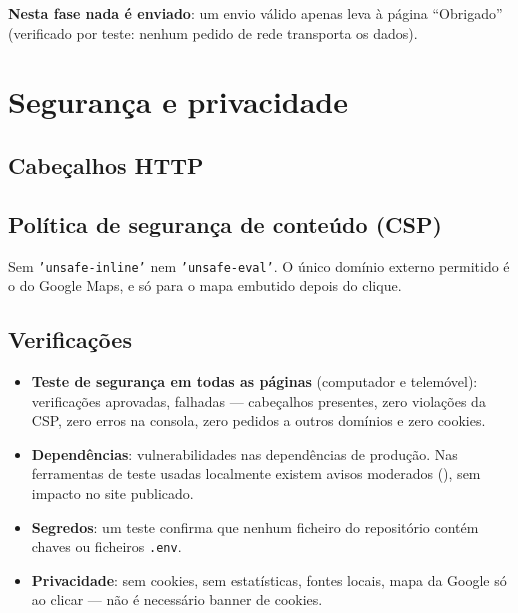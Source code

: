 \documentclass[11pt,a4paper]{article}
\begin{document}
\textbf{Nesta fase nada é enviado}: um envio válido apenas leva à página ``Obrigado'' (verificado por teste:
nenhum pedido de rede transporta os dados).

\section{Segurança e privacidade}
\subsection{Cabeçalhos HTTP}
\resHeadersTable

\subsection{Política de segurança de conteúdo (CSP)}
\resCspList
Sem \texttt{'unsafe-inline'} nem \texttt{'unsafe-eval'}. O único domínio externo permitido é o do Google
Maps, e só para o mapa embutido depois do clique.

\subsection{Verificações}
\begin{itemize}
  \item \textbf{Teste de segurança em todas as páginas} (computador e telemóvel): \resSecPassed{} verificações aprovadas, \resSecFailed{} falhadas --- cabeçalhos presentes, zero violações da CSP, zero erros na consola, zero pedidos a outros domínios e zero cookies.
  \item \textbf{Dependências}: \resAuditProd{} vulnerabilidades nas dependências de produção. Nas ferramentas de teste usadas localmente existem \resAuditDevModerate{} avisos moderados (\resAuditDevPackages), sem impacto no site publicado.
  \item \textbf{Segredos}: um teste confirma que nenhum ficheiro do repositório contém chaves ou ficheiros \texttt{.env}.
  \item \textbf{Privacidade}: sem cookies, sem estatísticas, fontes locais, mapa da Google só ao clicar --- não é necessário banner de cookies.
\end{itemize}

\end{document}

